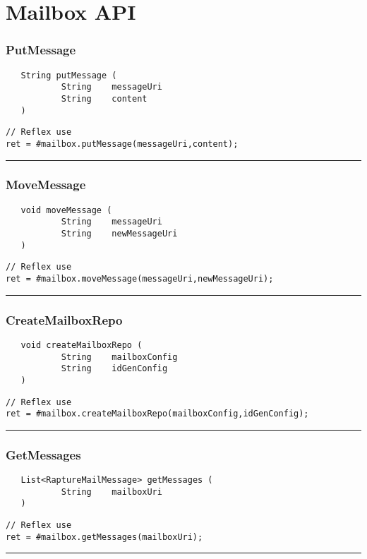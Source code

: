 \section{Mailbox API}

\subsubsection{PutMessage}
\label{Api:PutMessage}
\begin{verbatim}
   String putMessage (
           String    messageUri
           String    content
   )
\end{verbatim}
\begin{lstlisting}[language=reflex]
// Reflex use
ret = #mailbox.putMessage(messageUri,content);
\end{lstlisting}



\rule{15cm}{2pt}
\subsubsection{MoveMessage}
\label{Api:MoveMessage}
\begin{verbatim}
   void moveMessage (
           String    messageUri
           String    newMessageUri
   )
\end{verbatim}
\begin{lstlisting}[language=reflex]
// Reflex use
ret = #mailbox.moveMessage(messageUri,newMessageUri);
\end{lstlisting}



\rule{15cm}{2pt}
\subsubsection{CreateMailboxRepo}
\label{Api:CreateMailboxRepo}
\begin{verbatim}
   void createMailboxRepo (
           String    mailboxConfig
           String    idGenConfig
   )
\end{verbatim}
\begin{lstlisting}[language=reflex]
// Reflex use
ret = #mailbox.createMailboxRepo(mailboxConfig,idGenConfig);
\end{lstlisting}



\rule{15cm}{2pt}
\subsubsection{GetMessages}
\label{Api:GetMessages}
\begin{verbatim}
   List<RaptureMailMessage> getMessages (
           String    mailboxUri
   )
\end{verbatim}
\begin{lstlisting}[language=reflex]
// Reflex use
ret = #mailbox.getMessages(mailboxUri);
\end{lstlisting}



\rule{15cm}{2pt}
